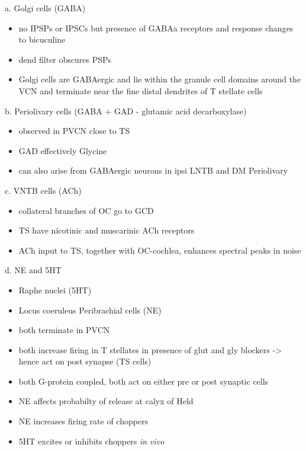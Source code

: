 a. Golgi cells (GABA)

\begin{itemize}
\item no IPSPs or IPSCs but presence of GABAa receptors and response changes to bicuculine \citep{WuOertel:1986,OertelWickesberg:1993,FerragamoGoldingEtAl:1998a}
\item dend filter obscures PSPs
\item Golgi cells are GABAergic and lie within the granule cell domains around the VCN and terminate near the fine distal dendrites of T stellate cells
\end{itemize}
b. Periolivary cells (GABA + GAD - glutamic acid decarboxylase) 

\begin{itemize}
\item observed in PVCN close to TS \citep{AdamsMugnaini:1987}
\item GAD effectively Glycine \citep{GoldingOertel:1997}
\item can also arise from GABAergic neurons in ipsi LNTB and DM Periolivary
\end{itemize}
c. VNTB cells (ACh)

\begin{itemize}
\item collateral branches of OC go to GCD \citep{MellottMottsEtAl:2011,SherriffHenderson:1994,OsenRoth:1969}
\item TS have nicotinic and muscarinic ACh receptors \citep{FujinoOertel:2001}
\item ACh input to TS, together with OC-cochlea, enhances spectral peaks in noise  \citep{FujinoOertel:2001}
\end{itemize}
d. NE and 5HT

\begin{itemize}
\item Raphe nuclei (5HT)
\item Locus coeruleus Peribrachial cells (NE)
\item both terminate in PVCN \citep{KlepperHerbert:1991,Thompson:2003,ThompsonLauder:2005,Thompson:2003a,ThompsonWiechmann:2002,BehrensSchofieldEtAl:2002,ThompsonThompson:2001,ThompsonThompson:2001a,ThompsonMooreEtAl:1995,ThompsonThompsonEtAl:1994}
\item both increase firing in T stellates \citep{OertelWrightEtAl:2010} in presence of glut and gly blockers -> hence act on post synapse (TS cells)
\item both G-protein coupled, both act on either pre or post synaptic cells
\item NE affects probabilty of release at calyx of Held
\item NE increases firing rate of choppers \citep{KosslVater:1989,Ebert:1996}
\item 5HT excites or inhibits choppers \emph{in vivo} \citep{EbertOstwald:1992}
\end{itemize}
